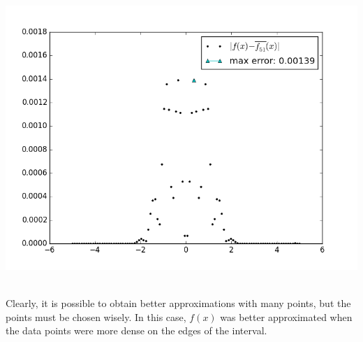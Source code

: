 \documentclass[12pt]{article}
\begin{document}
\centerline{\includegraphics[scale=0.65]{figures/problem4_g_error_51points.png}}\\
Clearly, it is possible to obtain better approximations with many points, but the points must be chosen wisely.  In this case, $f(x)$ was better approximated when the data points were more dense on the edges of the interval.

%
%
%
%
%
%
\end{document}
